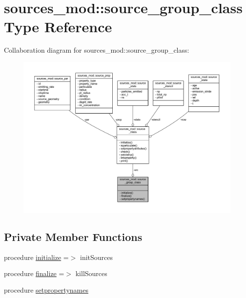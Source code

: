 \hypertarget{structsources__mod_1_1source__group__class}{}\section{sources\+\_\+mod\+:\+:source\+\_\+group\+\_\+class Type Reference}
\label{structsources__mod_1_1source__group__class}


Collaboration diagram for sources\+\_\+mod\+:\+:source\+\_\+group\+\_\+class\+:
\nopagebreak
\begin{figure}[H]
\begin{center}
\leavevmode
\includegraphics[width=350pt]{structsources__mod_1_1source__group__class__coll__graph}
\end{center}
\end{figure}
\subsection*{Private Member Functions}
\begin{DoxyCompactItemize}
\item 
procedure \mbox{\hyperlink{structsources__mod_1_1source__group__class_a186abc677118adbf1f9cff405dac330e}{initialize}} =$>$ init\+Sources
\item 
procedure \mbox{\hyperlink{structsources__mod_1_1source__group__class_ab1f12af6502f7e468e07d82555ea5cb9}{finalize}} =$>$ kill\+Sources
\item 
procedure \mbox{\hyperlink{structsources__mod_1_1source__group__class_afcd9f3654f50966bc72ffc32b4bee7dd}{setpropertynames}}
\end{DoxyCompactItemize}
